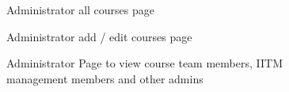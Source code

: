 \begin{figure}[H]
    \centering
    \caption{Administrator all courses page}
    \label{fig:admin_all_courses}
\end{figure}

\begin{figure}[H]
    \centering
    \caption{Administrator add / edit courses page}
    \label{fig:admin_add_edit_course}
\end{figure}

\begin{figure}[H]
    \centering
    \caption{Administrator Page to view course team members, IITM management members and other admins}
    \label{fig:admin_entity_page}
\end{figure}

